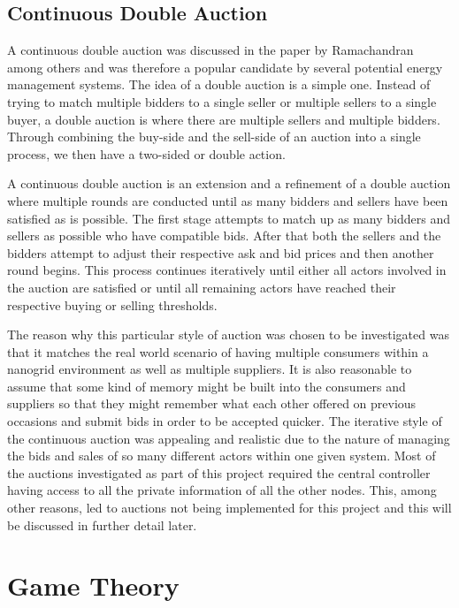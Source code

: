 \documentclass[a4paper, notitlepage]{report}
\begin{document}
\section{Continuous Double Auction}
\label{sec:org2b91699}
A continuous double auction was discussed in the paper by Ramachandran
\cite{ramachandran2011intelligent} among others and was therefore a popular
candidate by several potential energy management systems. The idea of a double
auction is a simple one. Instead of trying to match multiple bidders to a single
seller or multiple sellers to a single buyer, a double auction is where there
are multiple sellers and multiple bidders. Through combining the buy-side and
the sell-side of an auction into a single process, we then have a two-sided or
double action. 

A continuous double auction is an extension and a refinement of a double auction
where multiple rounds are conducted until as many bidders and sellers have been
satisfied as is possible. The first stage attempts to match up as many bidders
and sellers as possible who have compatible bids. After that both the sellers
and the bidders attempt to adjust their respective ask and bid prices and then
another round begins. This process continues iteratively until either all actors
involved in the auction are satisfied or until all remaining actors have reached
their respective buying or selling thresholds. 

The reason why this particular style of auction was chosen to be investigated
was that it matches the real world scenario of having multiple consumers within
a nanogrid environment as well as multiple suppliers. It is also reasonable to
assume that some kind of memory might be built into the consumers and suppliers
so that they might remember what each other offered on previous occasions and
submit bids in order to be accepted quicker. The iterative style of the
continuous auction was appealing and realistic due to the nature of managing the
bids and sales of so many different actors within one given system. Most of the
auctions investigated as part of this project required the central controller
having access to all the private information of all the other nodes. This, among
other reasons, led to auctions not being implemented for this project and this
will be discussed in further detail later.
\chapter{Game Theory}
\label{sec:org1e589f6}
\end{document}

